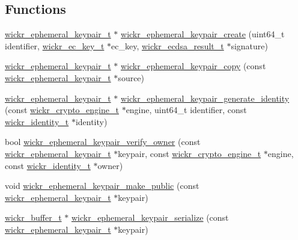 \subsection*{Functions}
\begin{DoxyCompactItemize}
\item 
\hyperlink{structwickr__ephemeral__keypair}{wickr\+\_\+ephemeral\+\_\+keypair\+\_\+t} $\ast$ \hyperlink{group__wickr__ephemeral__keypair_gab956214203938b4b02b8f30666eaec3b}{wickr\+\_\+ephemeral\+\_\+keypair\+\_\+create} (uint64\+\_\+t identifier, \hyperlink{structwickr__ec__key}{wickr\+\_\+ec\+\_\+key\+\_\+t} $\ast$ec\+\_\+key, \hyperlink{structwickr__ecdsa__result}{wickr\+\_\+ecdsa\+\_\+result\+\_\+t} $\ast$signature)
\item 
\hyperlink{structwickr__ephemeral__keypair}{wickr\+\_\+ephemeral\+\_\+keypair\+\_\+t} $\ast$ \hyperlink{group__wickr__ephemeral__keypair_gacf14f050221091093b9a2948bd569662}{wickr\+\_\+ephemeral\+\_\+keypair\+\_\+copy} (const \hyperlink{structwickr__ephemeral__keypair}{wickr\+\_\+ephemeral\+\_\+keypair\+\_\+t} $\ast$source)
\item 
\hyperlink{structwickr__ephemeral__keypair}{wickr\+\_\+ephemeral\+\_\+keypair\+\_\+t} $\ast$ \hyperlink{group__wickr__ephemeral__keypair_ga6c0935c579e3d4bdbfeada7cb60c2a1b}{wickr\+\_\+ephemeral\+\_\+keypair\+\_\+generate\+\_\+identity} (const \hyperlink{structwickr__crypto__engine}{wickr\+\_\+crypto\+\_\+engine\+\_\+t} $\ast$engine, uint64\+\_\+t identifier, const \hyperlink{structwickr__identity}{wickr\+\_\+identity\+\_\+t} $\ast$identity)
\item 
bool \hyperlink{group__wickr__ephemeral__keypair_gadc17110d4c7fa65a9456fae516bf2e5d}{wickr\+\_\+ephemeral\+\_\+keypair\+\_\+verify\+\_\+owner} (const \hyperlink{structwickr__ephemeral__keypair}{wickr\+\_\+ephemeral\+\_\+keypair\+\_\+t} $\ast$keypair, const \hyperlink{structwickr__crypto__engine}{wickr\+\_\+crypto\+\_\+engine\+\_\+t} $\ast$engine, const \hyperlink{structwickr__identity}{wickr\+\_\+identity\+\_\+t} $\ast$owner)
\item 
void \hyperlink{group__wickr__ephemeral__keypair_ga2e2f8db184aa2972ef5423e9c03988e8}{wickr\+\_\+ephemeral\+\_\+keypair\+\_\+make\+\_\+public} (const \hyperlink{structwickr__ephemeral__keypair}{wickr\+\_\+ephemeral\+\_\+keypair\+\_\+t} $\ast$keypair)
\item 
\hyperlink{structwickr__buffer}{wickr\+\_\+buffer\+\_\+t} $\ast$ \hyperlink{group__wickr__ephemeral__keypair_ga1c994a08f270cc84088263d48a4b3636}{wickr\+\_\+ephemeral\+\_\+keypair\+\_\+serialize} (const \hyperlink{structwickr__ephemeral__keypair}{wickr\+\_\+ephemeral\+\_\+keypair\+\_\+t} $\ast$keypair)

\end{DoxyCompactItemize}
